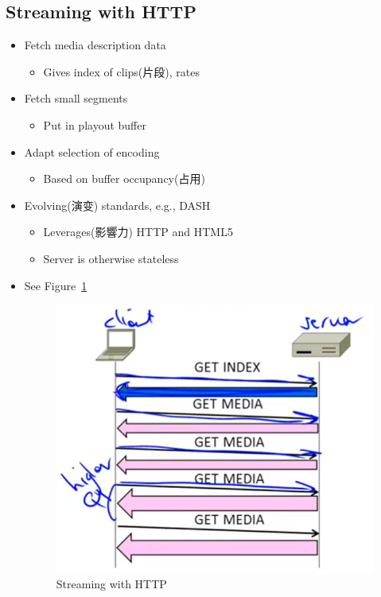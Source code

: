 \documentclass[12pt]{ctexart}   %
\begin{document}
	\subsection{Streaming with HTTP}
	\begin{itemize}
		\item Fetch media description data
		\begin{itemize}
			\item Gives index of clips(片段), rates
		\end{itemize}
		
		\item Fetch small segments
		\begin{itemize}
			\item Put in playout buffer
		\end{itemize}
		
		\item Adapt selection of encoding
		\begin{itemize}
			\item Based on buffer occupancy(占用)
		\end{itemize}
		
		\item Evolving(演变) standards, e.g., DASH
		\begin{itemize}
			\item Leverages(影響力) HTTP and HTML5
			\item Server is otherwise stateless 
		\end{itemize}
		\item See Figure~\ref{fig:9-3-6}
		  
		 \begin{figure}[h!] %
		\centering
		 \includegraphics[scale=0.7]{images/9-3-6}
		\caption{ Streaming with HTTP }
		 \label{fig:9-3-6}
		 \end{figure}
	\end{itemize}
	
\end{document}
